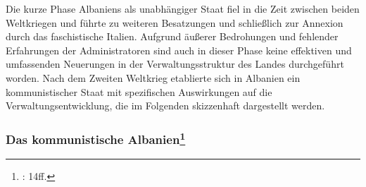Die kurze Phase Albaniens als unabhängiger Staat fiel in die Zeit zwischen beiden Weltkriegen und führte zu weiteren Besatzungen und schließlich zur Annexion durch das faschistische Italien. Aufgrund äußerer Bedrohungen und fehlender Erfahrungen der Administratoren sind auch in dieser Phase keine effektiven und umfassenden Neuerungen in der Verwaltungsstruktur des Landes durchgeführt worden. Nach dem Zweiten Weltkrieg etablierte sich in Albanien ein kommunistischer Staat mit spezifischen Auswirkungen auf die Verwaltungsentwicklung, die im Folgenden skizzenhaft dargestellt werden.
\subsubsection[Das kommunistische Albanien]{Das kommunistische Albanien\footnote{\cite{vollmer07} : 14ff.}}

